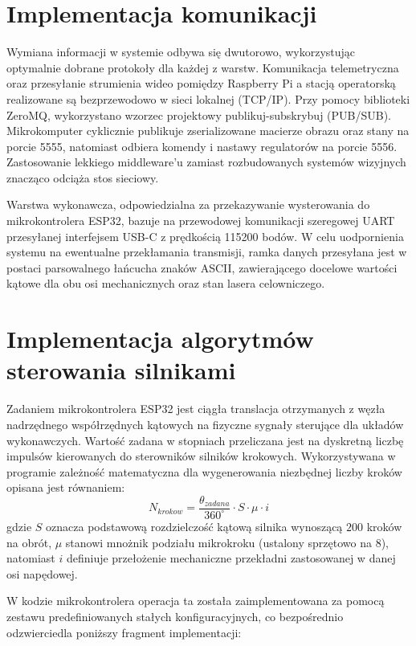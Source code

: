 \documentclass[a4paper,twoside,12pt]{book}
\begin{document}
\section{Implementacja komunikacji}
Wymiana informacji w systemie odbywa się dwutorowo, wykorzystując optymalnie dobrane protokoły dla każdej z warstw. Komunikacja telemetryczna oraz przesyłanie strumienia wideo pomiędzy Raspberry Pi a stacją operatorską realizowane są bezprzewodowo w sieci lokalnej (TCP/IP). Przy pomocy biblioteki ZeroMQ, wykorzystano wzorzec projektowy publikuj-subskrybuj (PUB/SUB). Mikrokomputer cyklicznie publikuje zserializowane macierze obrazu oraz stany na porcie 5555, natomiast odbiera komendy i nastawy regulatorów na porcie 5556. Zastosowanie lekkiego middleware'u zamiast rozbudowanych systemów wizyjnych znacząco odciąża stos sieciowy.

Warstwa wykonawcza, odpowiedzialna za przekazywanie wysterowania do mikrokontrolera ESP32, bazuje na przewodowej komunikacji szeregowej UART przesyłanej interfejsem USB-C z prędkością 115200 bodów. W celu uodpornienia systemu na ewentualne przekłamania transmisji, ramka danych przesyłana jest w postaci parsowalnego łańcucha znaków ASCII, zawierającego docelowe wartości kątowe dla obu osi mechanicznych oraz stan lasera celowniczego. 

\section{Implementacja algorytmów sterowania silnikami}

Zadaniem mikrokontrolera ESP32 jest ciągła translacja otrzymanych z węzła nadrzędnego współrzędnych kątowych na fizyczne sygnały sterujące dla układów wykonawczych. Wartość zadana w stopniach przeliczana jest na dyskretną liczbę impulsów kierowanych do sterowników silników krokowych. Wykorzystywana w programie zależność matematyczna dla wygenerowania niezbędnej liczby kroków opisana jest równaniem:
\begin{equation}
N_{krokow} = \frac{\theta_{zadana}}{360^\circ} \cdot S \cdot \mu \cdot i
\end{equation}
gdzie $S$ oznacza podstawową rozdzielczość kątową silnika wynoszącą $200$ kroków na obrót, $\mu$ stanowi mnożnik podziału mikrokroku (ustalony sprzętowo na $8$), natomiast $i$ definiuje przełożenie mechaniczne przekładni zastosowanej w danej osi napędowej. 

W kodzie mikrokontrolera operacja ta została zaimplementowana za pomocą zestawu predefiniowanych stałych konfiguracyjnych, co bezpośrednio odzwierciedla poniższy fragment implementacji:
\end{document}
